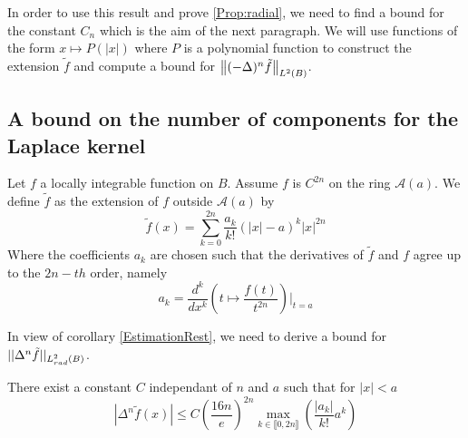 \documentclass[11pt,a4paper]{article}
\begin{document}
In order to use this result and prove \ref{Prop:radial}, we need to find a bound for the constant $C_n$ which is the aim of the next paragraph. We will use functions of the form $x \mapsto P(|x|)$ where $P$ is a polynomial function to construct the extension $\tilde{f}$ and compute a bound for $\left\|(-\Delta)^n \tilde{f}\right\|_{L^2(B)}$. 

\subsection{A bound on the number of components for the Laplace kernel}
\label{ProlongPoly}

\begin{Def} Let $f$ a locally integrable function on $B$. Assume $f$ is $C^{2n}$ on the ring $\mathcal{A}(a)$. We define $\tilde{f}$ as the extension of $f$ outside $\mathcal{A}(a)$ by 
\[\tilde{f}(x) = \displaystyle\sum_{k=0}^{2n} \frac{a_k}{k!}(|x|-a)^{k}|x|^{2n}\]
Where the coefficients $a_k$ are chosen such that the derivatives of $\tilde{f}$ and $f$ agree up to the $2n-th$ order, namely 
\[a_k  = \dfrac{d^k }{dx^k}\left(t\mapsto \dfrac{f(t)}{t^{2n}}\right)\Bigr|_{t=a}\] 
\label{ProlongementDef}
\end{Def}

In view of corollary \ref{EstimationRest}, we need to derive a bound for $||\Delta^n \tilde{f}||_{L^2_{rad}(B)}$.

\begin{Lem} 
\label{LemmeDegueu}
There exist a constant $C$ independant of $n$ and $a$ such that for $|x|<a$
\begin{equation}
\left|\Delta^n \tilde{f}(x)\right| \leq  C \left( \frac{16n}{e}\right)^{2n}\max_{k\in\llbracket 0,2n\rrbracket}\left(\dfrac{|a_k|}{k!}a^k\right)
\label{bigBadEq1Reduced}
\end{equation}
\label{LemAkDeltanf}
\end{Lem}
\end{document}
